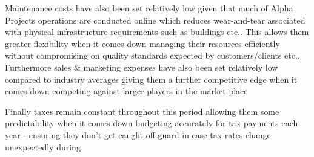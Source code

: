 Maintenance costs have also been set relatively low given that much of Alpha Projects operations are conducted online which reduces wear-and-tear associated with physical infrastructure requirements such as buildings etc.. This allows them greater flexibility when it comes down managing their resources efficiently without compromising on quality standards expected by customers/clients etc.. Furthermore sales & marketing expenses have also been set relatively low compared to industry averages giving them a further competitive edge when it comes down competing against larger players in the market place 

 Finally taxes remain constant throughout this period allowing them some predictability when it comes down budgeting accurately for tax payments each year - ensuring they don't get caught off guard in case tax rates change unexpectedly during